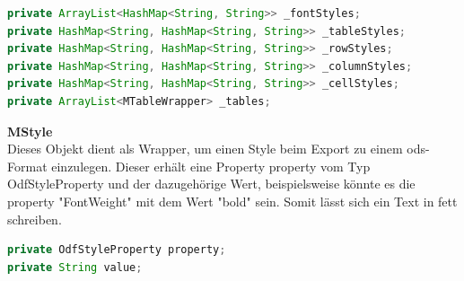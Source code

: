 \begin{lstlisting}[caption=Repräsentation einer kompletten Libre Office Calc Datei, language=Java]
private ArrayList<HashMap<String, String>> _fontStyles;
private HashMap<String, HashMap<String, String>> _tableStyles;
private HashMap<String, HashMap<String, String>> _rowStyles;
private HashMap<String, HashMap<String, String>> _columnStyles;
private HashMap<String, HashMap<String, String>> _cellStyles;
private ArrayList<MTableWrapper> _tables;
\end{lstlisting}
\textbf{MStyle}\\
Dieses Objekt dient als Wrapper, um einen Style beim Export zu einem ods-Format einzulegen. Dieser erhält eine Property property vom Typ OdfStyleProperty und der dazugehörige Wert, beispielsweise könnte es die property "FontWeight" mit dem Wert "bold" sein. Somit lässt sich ein Text in fett schreiben.

\begin{lstlisting}[caption=Repräsentation eines Styles einer Libre Office Calc Datei, language=Java]
private OdfStyleProperty property;
private String value;
\end{lstlisting}

